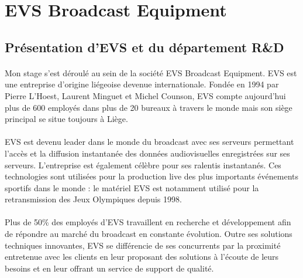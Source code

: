 \documentclass{article}
\begin{document}

    \newpage
    \section{EVS Broadcast Equipment}
    \subsection{Présentation d'EVS et du département R\&D}
    \paragraph{}
    Mon stage s'est déroulé au sein de la société EVS Broadcast Equipment. EVS est une entreprise d'origine liégeoise devenue internationale. Fondée en 1994 par Pierre L'Hoest, Laurent Minguet et Michel Counson, EVS compte aujourd'hui plus de 600 employés dans plus de 20 bureaux à travers le monde mais son siège principal se situe toujours à Liège\cite{EVS:website}.

    \paragraph{}
    EVS est devenu leader dans le monde du broadcast avec ses serveurs permettant l'accès et la diffusion instantanée des données audiovisuelles enregistrées sur ses serveurs. L'entreprise est également célèbre pour ses ralentis instantanés. Ces technologies sont utilisées pour la production live des plus importants événements sportifs dans le monde : le matériel EVS est notamment utilisé pour la retransmission des Jeux Olympiques depuis 1998.

    \paragraph{}
    Plus de 50\% des employés d'EVS travaillent en recherche et développement afin de répondre au marché du broadcast en constante évolution. Outre ses solutions techniques innovantes, EVS se différencie de ses concurrents par la proximité entretenue avec les clients en leur proposant des solutions à l'écoute de leurs besoins et en leur offrant un service de support de qualité.
\end{document}
